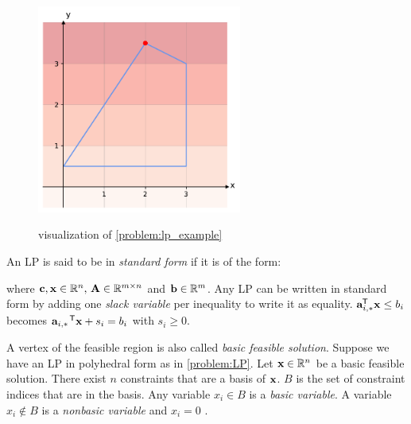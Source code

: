 \begin{figure}[h!]
    \caption{visualization of \cref{problem:lp_example}}
    \centering
    \includegraphics[width=0.6\textwidth]{Images/lp.pdf}
    \label{fig:lp}
\end{figure}

An LP is said to be in \textit{standard form} if it is of the form:

where $\bold c, \bold x \in \mathbb{R}^n, \, \bold A \in \mathbb{R}^{m \times n}$ and $\bold b \in \mathbb{R}^m$. Any LP can be written in standard form by adding one \textit{slack variable} per inequality to write it as equality. $\bold a_{i,*} ^{\mkern-1.5mu\mathsf{T}} \bold x \leq b_i$ becomes $\bold a_{i,*} \,^{\mkern-1.5mu\mathsf{T}} \bold x + s_i = b_i$ with $s_i \geq 0$.
\cite{noauthor_numerical_2006}

A vertex of the feasible region is also called \textit{basic feasible solution}. Suppose we have an LP in polyhedral form as in \cref{problem:LP}. Let $\bold x \in \mathbb{R}^n$ be a basic feasible solution. There exist $n$ constraints that are a basis of $\bold x$. $B$ is the set of constraint indices that are in the basis. Any variable $x_i \in B$ is a \textit{basic variable}. A variable $x_i \not \in B$ is a \textit{nonbasic variable} and $x_i=0$ \cite{understanding_lp}.

